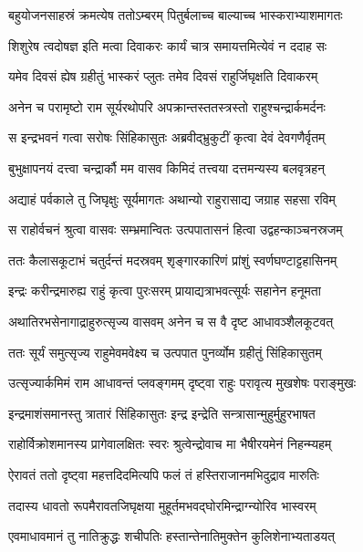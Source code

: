 \twolineshloka
{बहुयोजनसाहस्रं क्रमत्येष ततोऽम्बरम्}
{पितुर्बलाच्च बाल्याच्च भास्कराभ्याशमागतः} %

\twolineshloka
{शिशुरेष त्वदोषज्ञ इति मत्वा दिवाकरः}
{कार्यं चात्र समायत्तमित्येवं न ददाह सः} %

\twolineshloka
{यमेव दिवसं ह्येष ग्रहीतुं भास्करं प्लुतः}
{तमेव दिवसं राहुर्जिघृक्षति दिवाकरम्} %

\twolineshloka
{अनेन च परामृष्टो राम सूर्यरथोपरि}
{अपक्रान्तस्ततस्त्रस्तो राहुश्चन्द्रार्कमर्दनः} %

\twolineshloka
{स इन्द्रभवनं गत्वा सरोषः सिंहिकासुतः}
{अब्रवीद्भ्रुकुटीं कृत्वा देवं देवगणैर्वृतम्} %

\twolineshloka
{बुभुक्षापनयं दत्त्वा चन्द्रार्कौ मम वासव}
{किमिदं तत्त्वया दत्तमन्यस्य बलवृत्रहन्} %

\twolineshloka
{अद्याहं पर्वकाले तु जिघृक्षुः सूर्यमागतः}
{अथान्यो राहुरासाद्य जग्राह सहसा रविम्} %

\twolineshloka
{स राहोर्वचनं श्रुत्वा वासवः सम्भ्रमान्वितः}
{उत्पपातासनं हित्वा उद्वहन्काञ्चनस्रजम्} %

\twolineshloka
{ततः कैलासकूटाभं चतुर्दन्तं मदस्रवम्}
{शृङ्गारकारिणं प्रांशुं स्वर्णघण्टाट्टहासिनम्} %

\twolineshloka
{इन्द्रः करीन्द्रमारुह्य राहुं कृत्वा पुरःसरम्}
{प्रायाद्यत्राभवत्सूर्यः सहानेन हनूमता} %

\twolineshloka
{अथातिरभसेनागाद्राहुरुत्सृज्य वासवम्}
{अनेन च स वै दृष्ट आधावञ्शैलकूटवत्} %

\twolineshloka
{ततः सूर्यं समुत्सृज्य राहुमेवमवेक्ष्य च}
{उत्पपात पुनर्व्योम ग्रहीतुं सिंहिकासुतम्} %

\twolineshloka
{उत्सृज्यार्कमिमं राम आधावन्तं प्लवङ्गमम्}
{दृष्ट्वा राहुः परावृत्य मुखशेषः पराङ्मुखः} %

\twolineshloka
{इन्द्रमाशंसमानस्तु त्रातारं सिंहिकासुतः}
{इन्द्र इन्द्रेति सन्त्रासान्मुहुर्मुहुरभाषत} %

\twolineshloka
{राहोर्विक्रोशमानस्य प्रागेवालक्षितः स्वरः}
{श्रुत्वेन्द्रोवाच मा भैषीरयमेनं निहन्म्यहम्} %

\twolineshloka
{ऐरावतं ततो दृष्ट्वा महत्तदिदमित्यपि}
{फलं तं हस्तिराजानमभिदुद्राव मारुतिः} %

\twolineshloka
{तदास्य धावतो रूपमैरावतजिघृक्षया}
{मुहूर्तमभवद्घोरमिन्द्राग्न्योरिव भास्वरम्} %

\twolineshloka
{एवमाधावमानं तु नातिक्रुद्धः शचीपतिः}
{हस्तान्तेनातिमुक्तेन कुलिशेनाभ्यताडयत्} %

